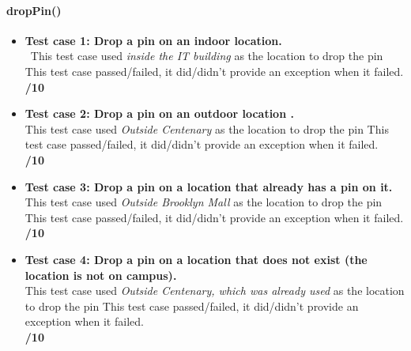 \documentclass[runningheads,a4paper]{article}
\begin{document}
	\paragraph{dropPin()}
		\begin{itemize}
			\item \textbf{Test case 1: Drop a pin on an indoor location.} \\\
				This test case used \textit{inside the IT building} as the location to drop the pin
				This test case passed/failed, it did/didn't provide an exception when it failed.
			\\ \textbf{/10}
			\item \textbf{Test case 2: Drop a pin on an outdoor location .} \\
				This test case used \textit{Outside Centenary} as the location to drop the pin
				This test case passed/failed, it did/didn't provide an exception when it failed.
			\\ \textbf{/10}
			\item \textbf{Test case 3: Drop a pin on a location that already has a pin on it.} \\
				This test case used \textit{Outside Brooklyn Mall} as the location to drop the pin
				This test case passed/failed, it did/didn't provide an exception when it failed.
			\\ \textbf{/10}
			\item \textbf{Test case 4: Drop a pin on a location that does not exist (the location is not on campus).} \\
				This test case used \textit{Outside Centenary, which was already used} as the location to drop the pin
				This test case passed/failed, it did/didn't provide an exception when it failed.
			\\ \textbf{/10}

		\end{itemize}
	
\end{document}
